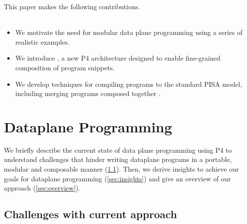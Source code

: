 \documentclass[letterpaper,twocolumn,10pt]{article}
\begin{document}
This paper makes the following contributions.\\
\\
\begin{itemize}
\item We motivate the need for modular data plane programming using a
  series of realistic examples.
\item We introduce \uarch, a new P4 architecture designed to enable
  fine-grained composition of program snippets.
\item We develop techniques for compiling \uarch programs to the
  standard PISA model, including merging programs composed together 
  .
\end{itemize}





\section{Dataplane Programming}
\label{sec:background}

We briefly describe the current state of data plane programming using
P4 to understand challenges that hinder writing dataplane programs in
a portable, modular and composable manner (\cref{sec:challenges}).
Then, we derive insights to achieve our goals for dataplane
programming (\cref{sec:insights}) and give an overview of our approach
(\cref{sec:overview}).



\subsection{Challenges with current approach}
\label{sec:challenges}
\end{document}
